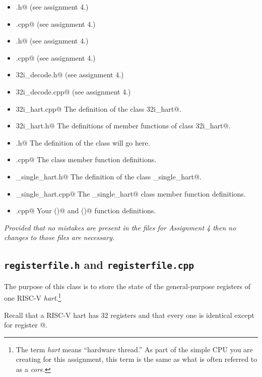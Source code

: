 \documentclass{article}
\begin{document}
\begin{itemize}
\item \verb@hex.h@ (see assignment 4.)
\item \verb@hex.cpp@ (see assignment 4.)
\item \verb@memory.h@ (see assignment 4.)
\item \verb@memory.cpp@ (see assignment 4.)

\item \verb@rv32i_decode.h@ (see assignment 4.)
\item \verb@rv32i_decode.cpp@ (see assignment 4.)

\item \verb@rv32i_hart.cpp@ The definition of the class \verb@rv32i_hart@.
\item \verb@rv32i_hart.h@ The definitions of member functions of class \verb@rv32i_hart@.

\item \verb@registerfile.h@ The definition of the \verb@registerfile@ class will go here.
\item \verb@registerfile.cpp@ The \verb@registerfile@ class member function definitions.

\item \verb@cpu_single_hart.h@ The definition of the class \verb@cpu_single_hart@.
\item \verb@cpu_single_hart.cpp@ The \verb@cpu_single_hart@ class member function definitions.

\item \verb@main.cpp@ Your \verb@main()@ and \verb@usage()@ function definitions.
\end{itemize}

{\em Provided that no mistakes are present in the files for Assignment 4 then
no changes to those files are necessary.}


\subsection{{\tt registerfile.h} and {\tt registerfile.cpp}}

The purpose of this class is to store the state of the general-purpose 
registers of one RISC-V {\em hart}.\footnote{The term {\em hart} means
``hardware thread.''  As part of the simple CPU you are creating for 
this assignment, this term is the same as what is often referred to 
as a {\em core}.}

Recall that a RISC-V hart has 32 registers and that every one is
identical except for register @.
\end{document}
